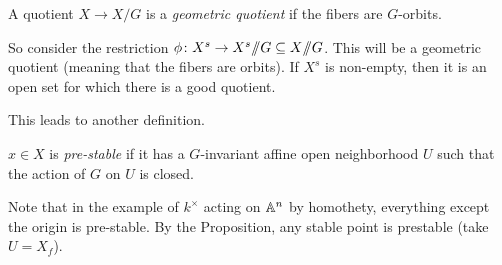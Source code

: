 \begin{definition}
 A quotient $X\to X/G$ is a \emph{geometric quotient} if the fibers are $G$-orbits.
\end{definition}

So consider the restriction $\phi\colon X^s\to X^s\quot G\subseteq X\quot G$. This will be a geometric quotient (meaning that the fibers are orbits). If $X^s$ is non-empty, then it is an open set for which there is a good quotient.

This leads to another definition.
\begin{definition}
 $x\in X$ is \emph{pre-stable} if it has a $G$-invariant affine open neighborhood $U$ such that the action of $G$ on $U$ is closed.
\end{definition}
Note that in the example of $k^\times$ acting on $\AA^n$ by homothety, everything except the origin is pre-stable. By the Proposition, any stable point is prestable (take $U=X_f$).


